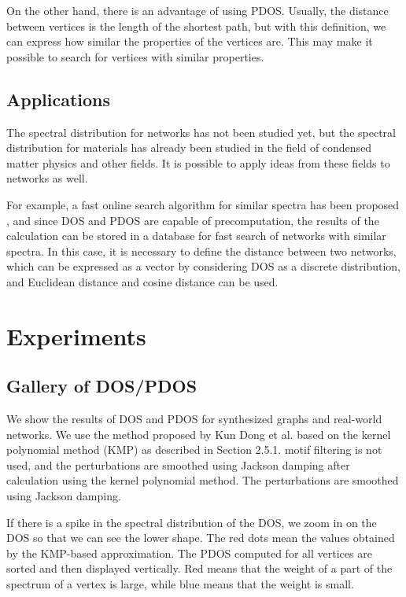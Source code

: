 \documentclass[senior,final,11pt]{iscs-thesis}
\begin{document}
On the other hand, there is an advantage of using PDOS. Usually, the distance between vertices is the length of the shortest path, but with this definition, we can express how similar the properties of the vertices are. This may make it possible to search for vertices with similar properties.

\subsection{Applications}
The spectral distribution for networks has not been studied yet, but the spectral distribution for materials has already been studied in the field of condensed matter physics and other fields. It is possible to apply ideas from these fields to networks as well.

For example, a fast online search algorithm for similar spectra has been proposed \cite{borysov2018online,geilhufe2018towards}, and since DOS and PDOS are capable of precomputation, the results of the calculation can be stored in a database for fast search of networks with similar spectra. In this case, it is necessary to define the distance between two networks, which can be expressed as a vector by considering DOS as a discrete distribution, and Euclidean distance and cosine distance can be used.

\section{Experiments}
\subsection{Gallery of DOS/PDOS}
We show the results of DOS and PDOS for synthesized graphs and real-world networks. We use the method proposed by Kun Dong et al. based on the kernel polynomial method (KMP) as described in Section 2.5.1. motif filtering is not used, and the perturbations are smoothed using Jackson damping after calculation using the kernel polynomial method. The perturbations are smoothed using Jackson damping.

If there is a spike in the spectral distribution of the DOS, we zoom in on the DOS so that we can see the lower shape. The red dots mean the values obtained by the KMP-based approximation.
The PDOS computed for all vertices are sorted and then displayed vertically. Red means that the weight of a part of the spectrum of a vertex is large, while blue means that the weight is small.
\end{document}

